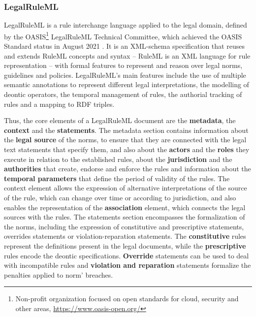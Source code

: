 \subsubsection{LegalRuleML}
\label{sec:legalruleml}

LegalRuleML is a rule interchange language applied to the legal domain, defined by the OASIS\footnote{Non-profit organization focused on open standards for cloud, security and other areas, \url{https://www.oasis-open.org/}} LegalRuleML Technical Committee, which achieved the OASIS Standard status in August 2021 \citep{palmirani_legalruleml_2021}.
It is an XML-schema specification that reuses and extends RuleML concepts and syntax -- RuleML is an XML language for rule representation \citep{boley_specification_2017} -- with formal features to represent and reason over legal norms, guidelines and policies.
LegalRuleML's main features include the use of multiple semantic annotations to represent different legal interpretations, the modelling of deontic operators, the temporal management of rules, the authorial tracking of rules and a mapping to RDF triples. 

Thus, the core elements of a LegalRuleML document are the \textbf{metadata}, the \textbf{context} and the \textbf{statements}.
The metadata section contains information about the \textbf{legal source} of the norms, to ensure that they are connected with the legal text statements that specify them, and also about the \textbf{actors} and the \textbf{roles} they execute in relation to the established rules, about the \textbf{jurisdiction} and the \textbf{authorities} that create, endorse and enforce the rules and information about the \textbf{temporal parameters} that define the period of validity of the rules.
The context element allows the expression of alternative interpretations of the source of the rule, which can change over time or according to jurisdiction, and also enables the representation of the \textbf{association} element, which connects the legal sources with the rules.
The statements section encompasses the formalization of the norms, including the expression of constitutive and prescriptive statements, overrides statements or violation-reparation statements.
The \textbf{constitutive} rules represent the definitions present in the legal documents, while the \textbf{prescriptive} rules encode the deontic specifications.
\textbf{Override} statements can be used to deal with incompatible rules and \textbf{violation and reparation} statements formalize the penalties applied to norm' breaches.

